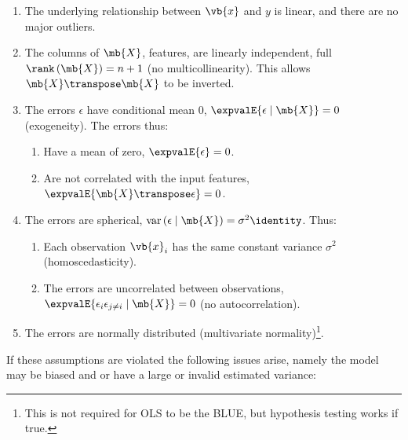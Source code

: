 \begin{enumerate}[noitemsep]
  \item The underlying relationship between $\vb{x}$ and $y$ is linear, and there are no major outliers.\label{item:regression:linear:linear}
  \item The columns of $\mb{X}$, \ie features, are linearly independent, \ie full $\rank\left(\mb{X}\right) = n+1$ (no multicollinearity). This allows $\mb{X}\transpose\mb{X}$ to be inverted.\label{item:regression:linear:multicollinearity}
  \item The errors $\epsilon$ have conditional mean 0, $\expvalE{\epsilon \mid \mb{X}} = 0$ (exogeneity). The errors thus:\label{item:regression:linear:exogeneity}
  \begin{enumerate}[noitemsep]
    \item Have a mean of zero, $\expvalE{\epsilon} = 0$.
    \item Are not correlated with the input features, $\expvalE{\mb{X}\transpose\epsilon} = 0$.
  \end{enumerate}
  \item The errors are spherical, $\mathrm{var}\left(\epsilon \mid \mb{X}\right) = \sigma^{2} \identity$. Thus:\label{item:regression:linear:spherical}
  \begin{enumerate}[noitemsep]
    \item Each observation $\vb{x}_{i}$ has the same constant variance $\sigma^{2}$ (homoscedasticity).
    \item The errors are uncorrelated between observations, $\expvalE{\epsilon_{i}\epsilon_{j \neq i} \mid \mb{X}} = 0$ (no autocorrelation).
  \end{enumerate}
  \item The errors are normally distributed (multivariate normality)\footnote{This is not required for OLS to be the BLUE, but hypothesis testing works if true.}.\label{item:regression:linear:normality}
\end{enumerate}

If these assumptions are violated the following issues arise,
namely the model may be biased and or have a large or invalid estimated variance:


